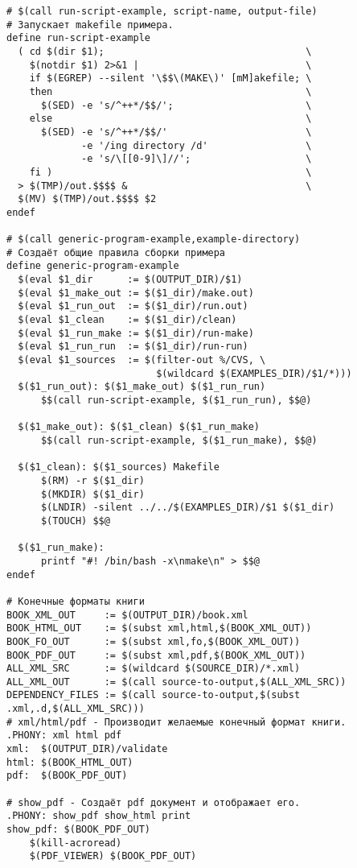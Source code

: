 {\begin{verbatim}
# $(call run-script-example, script-name, output-file)
# Запускает makefile примера.
define run-script-example
  ( cd $(dir $1);                                   \
    $(notdir $1) 2>&1 |                             \
    if $(EGREP) --silent '\$$\(MAKE\)' [mM]akefile; \
    then                                            \
      $(SED) -e 's/^++*/$$/';                       \
    else                                            \
      $(SED) -e 's/^++*/$$/'                        \
             -e '/ing directory /d'                 \
             -e 's/\[[0-9]\]//';                    \
    fi )                                            \
  > $(TMP)/out.$$$$ &                               \
  $(MV) $(TMP)/out.$$$$ $2
endef

# $(call generic-program-example,example-directory)
# Создаёт общие правила сборки примера
define generic-program-example
  $(eval $1_dir      := $(OUTPUT_DIR)/$1)
  $(eval $1_make_out := $($1_dir)/make.out)
  $(eval $1_run_out  := $($1_dir)/run.out)
  $(eval $1_clean    := $($1_dir)/clean)
  $(eval $1_run_make := $($1_dir)/run-make)
  $(eval $1_run_run  := $($1_dir)/run-run)
  $(eval $1_sources  := $(filter-out %/CVS, \
                          $(wildcard $(EXAMPLES_DIR)/$1/*)))
  $($1_run_out): $($1_make_out) $($1_run_run)
      $$(call run-script-example, $($1_run_run), $$@)

  $($1_make_out): $($1_clean) $($1_run_make)
      $$(call run-script-example, $($1_run_make), $$@)

  $($1_clean): $($1_sources) Makefile
      $(RM) -r $($1_dir)
      $(MKDIR) $($1_dir)
      $(LNDIR) -silent ../../$(EXAMPLES_DIR)/$1 $($1_dir)
      $(TOUCH) $$@

  $($1_run_make):
      printf "#! /bin/bash -x\nmake\n" > $$@
endef

# Конечные форматы книги
BOOK_XML_OUT     := $(OUTPUT_DIR)/book.xml
BOOK_HTML_OUT    := $(subst xml,html,$(BOOK_XML_OUT))
BOOK_FO_OUT      := $(subst xml,fo,$(BOOK_XML_OUT))
BOOK_PDF_OUT     := $(subst xml,pdf,$(BOOK_XML_OUT))
ALL_XML_SRC      := $(wildcard $(SOURCE_DIR)/*.xml)
ALL_XML_OUT      := $(call source-to-output,$(ALL_XML_SRC))
DEPENDENCY_FILES := $(call source-to-output,$(subst .xml,.d,$(ALL_XML_SRC)))
# xml/html/pdf - Производит желаемые конечный формат книги.
.PHONY: xml html pdf
xml:  $(OUTPUT_DIR)/validate
html: $(BOOK_HTML_OUT)
pdf:  $(BOOK_PDF_OUT)

# show_pdf - Создаёт pdf документ и отображает его.
.PHONY: show_pdf show_html print
show_pdf: $(BOOK_PDF_OUT)
    $(kill-acroread)
    $(PDF_VIEWER) $(BOOK_PDF_OUT)


\end{verbatim}}
